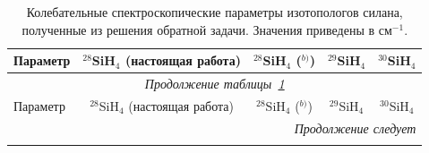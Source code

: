 \begingroup
\small
\setlength{\tabcolsep}{4pt}
\renewcommand{\arraystretch}{1.05}
\begin{longtable}{lcccc}
\caption{Колебательные спектроскопические параметры изотопологов силана, полученные из решения обратной задачи. Значения приведены в см$^{-1}$.}\label{tab:si_vibrational_parameters}\\
\hline
Параметр & ${}^{28}$SiH$_4$ (настоящая работа) & ${}^{28}$SiH$_4$ (\cite{wang}$^{b)}$) & ${}^{29}$SiH$_4$ & ${}^{30}$SiH$_4$ \\
\hline
\endfirsthead
\hline
\multicolumn{5}{c}{\small\slshape Продолжение таблицы~\ref{tab:si_vibrational_parameters}}\\
\hline
Параметр & ${}^{28}$SiH$_4$ (настоящая работа) & ${}^{28}$SiH$_4$ (\cite{wang}$^{b)}$) & ${}^{29}$SiH$_4$ & ${}^{30}$SiH$_4$ \\
\hline
\endhead
\hline
\multicolumn{5}{r}{\small\slshape Продолжение следует}\\
\endfoot
\hline\hline
\endlastfoot

\end{longtable}
